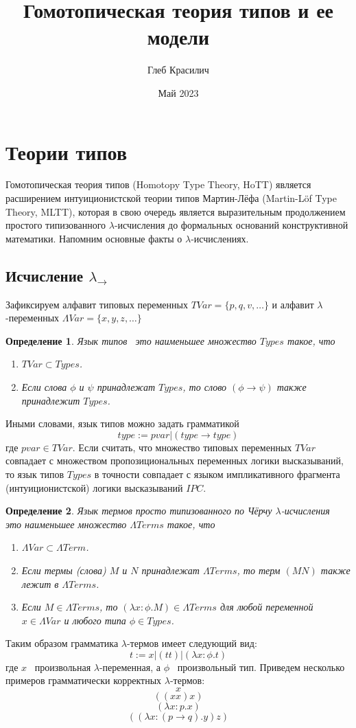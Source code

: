 \documentclass{article}[12pt]
\title{Гомотопическая теория типов и ее модели}
\author{Глеб Красилич}
\date{Май 2023}
\newtheorem{definition}{Определение}
\newcommand{\dash}{\textemdash\ }
\begin{document}
\maketitle

\section{Теории типов}

Гомотопическая теория типов (Homotopy Type Theory, HoTT) является расширением интуиционистской теории типов
Мартин-Лёфа (Martin-Löf Type Theory, MLTT), которая в свою очередь является выразительным
продолжением простого типизованного $\lambda$-исчисления до формальных оснований конструктивной математики.
Напомним основные факты о $\lambda$-исчислениях.

\subsection{Исчисление $\lambda_\rightarrow$}

Зафиксируем алфавит типовых переменных $TVar = \{p, q, v, \dots \}$ и алфавит $\lambda$-переменных
$\Lambda Var = \{x, y, z, \dots \}$
\begin{definition}
    Язык типов \dash это наименьшее множество $Types$ такое, что
    \begin{enumerate}
        \item $TVar \subset Types$.
        \item Если слова $\phi$ и $\psi$ принадлежат $Types$, то слово $(\phi \rightarrow \psi)$
        также принадлежит $Types$.
    \end{enumerate}
\end{definition}
Иными словами, язык типов можно задать грамматикой
$$type := pvar | (type \rightarrow type)$$
где $pvar \in TVar$. Если считать, что множество типовых переменных $TVar$ совпадает с множеством
пропозициональных переменных логики высказываний, то язык типов $Types$ в точности совпадает с
языком импликативного фрагмента (интуиционистской) логики высказываний $IPC$.  

\begin{definition}
    Язык термов просто типизованного по Чёрчу $\lambda$-исчисления \dash
    это наименьшее множество $\Lambda Terms$ такое, что
    \begin{enumerate}
        \item $\Lambda Var \subset \Lambda Term$.
        \item Если термы (слова) $M$ и $N$ принадлежат $\Lambda Terms$, то терм
        $(MN)$ также лежит в $\Lambda Terms$.
        \item Если $M \in \Lambda Terms$, то $(\lambda x : \phi . M) \in \Lambda Terms$
        для любой переменной $x \in \Lambda Var$ и любого типа $\phi \in Types$.
    \end{enumerate}
\end{definition}
Таким образом грамматика $\lambda$-термов имеет следующий вид:
$$t := x | (tt) | (\lambda x : \phi . t)$$
где $x$ \dash произвольная $\lambda$-переменная, а $\phi$ \dash произвольный тип.
Приведем несколько примеров грамматически корректных $\lambda$-термов:
$$x$$
$$((xx)x)$$
$$(\lambda x : p . x)$$
$$((\lambda x : (p \rightarrow q).y)z)$$
\end{document}
